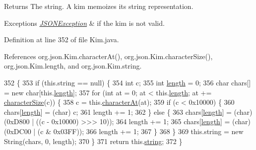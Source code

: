 \begin{DoxyReturn}{Returns}
The string. A kim memoizes its string representation. 
\end{DoxyReturn}

\begin{DoxyExceptions}{Exceptions}
{\em \hyperlink{classorg_1_1json_1_1_j_s_o_n_exception}{J\-S\-O\-N\-Exception}} & if the kim is not valid. \\
\hline
\end{DoxyExceptions}


Definition at line 352 of file Kim.\-java.



References org.\-json.\-Kim.\-character\-At(), org.\-json.\-Kim.\-character\-Size(), org.\-json.\-Kim.\-length, and org.\-json.\-Kim.\-string.


\begin{DoxyCode}
352                                                   \{
353         \textcolor{keywordflow}{if} (this.\textcolor{keywordtype}{string} == null) \{
354             \textcolor{keywordtype}{int} c;
355             \textcolor{keywordtype}{int} \hyperlink{classorg_1_1json_1_1_kim_a6caa186b493021e083e4efbf734e3a40}{length} = 0;
356             \textcolor{keywordtype}{char} chars[] = \textcolor{keyword}{new} \textcolor{keywordtype}{char}[this.\hyperlink{classorg_1_1json_1_1_kim_a6caa186b493021e083e4efbf734e3a40}{length}];
357             \textcolor{keywordflow}{for} (\textcolor{keywordtype}{int} at = 0; at < this.\hyperlink{classorg_1_1json_1_1_kim_a6caa186b493021e083e4efbf734e3a40}{length}; at += \hyperlink{classorg_1_1json_1_1_kim_a8d2ebca093fcc820ae233af45fb2ab75}{characterSize}(c)) \{
358                 c = this.\hyperlink{classorg_1_1json_1_1_kim_ac3c5fafa8f35357441582a217e2288ff}{characterAt}(at);
359                 \textcolor{keywordflow}{if} (c < 0x10000) \{
360                     chars[\hyperlink{classorg_1_1json_1_1_kim_a6caa186b493021e083e4efbf734e3a40}{length}] = (char) c;
361                     length += 1;
362                 \} \textcolor{keywordflow}{else} \{
363                     chars[\hyperlink{classorg_1_1json_1_1_kim_a6caa186b493021e083e4efbf734e3a40}{length}] = (char) (0xD800 | ((c - 0x10000) >>> 10));
364                     length += 1;
365                     chars[\hyperlink{classorg_1_1json_1_1_kim_a6caa186b493021e083e4efbf734e3a40}{length}] = (char) (0xDC00 | (c & 0x03FF));
366                     length += 1;
367                 \}
368             \}
369             this.\textcolor{keywordtype}{string} = \textcolor{keyword}{new} String(chars, 0, length);
370         \}
371         \textcolor{keywordflow}{return} this.\hyperlink{classorg_1_1json_1_1_kim_ab3c21a745d0601eb36105ec3769a310a}{string};
372     \}
\end{DoxyCode}


